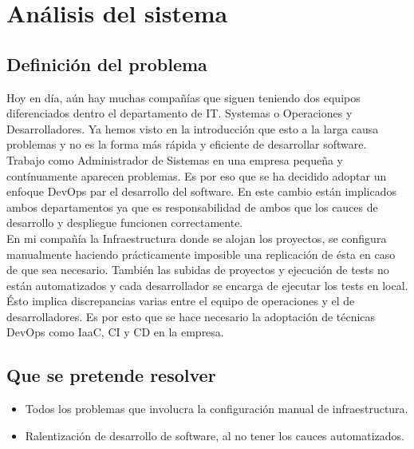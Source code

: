 \chapter {Análisis del sistema}

\section{Definición del problema}
\begin{paragraph}
	Hoy en día, aún hay muchas compañías que siguen teniendo dos equipos diferenciados dentro el departamento de IT. Systemas o Operaciones y Desarrolladores. Ya hemos visto en la introducción que esto a la larga causa problemas y no es la forma más rápida y eficiente de desarrollar software. \\
	Trabajo como Administrador de Sistemas en una empresa pequeña y contínuamente aparecen problemas. Es por eso que se ha decidido adoptar un enfoque DevOps par el desarrollo del software. En este cambio están implicados ambos departamentos ya que es responsabilidad de ambos que los cauces de desarrollo y despliegue funcionen correctamente. \\
	En mi compañía la Infraestructura donde se alojan los proyectos, se configura manualmente haciendo prácticamente imposible una replicación de ésta en caso de que sea necesario. También las subidas de proyectos y ejecución de tests no están automatizados y cada desarrollador se encarga de ejecutar los tests en local. Ésto implica discrepancias varias entre el equipo de operaciones y el de desarrolladores. Es por esto que se hace necesario la adoptación de técnicas DevOps como IaaC, CI y CD en la empresa.
\end{paragraph}
\section{Que se pretende resolver}
		\begin{itemize}
			\item Todos los problemas que involucra la configuración manual de infraestructura.
			\item Ralentización de desarrollo de software, al no tener los cauces automatizados.
		\end{itemize}
